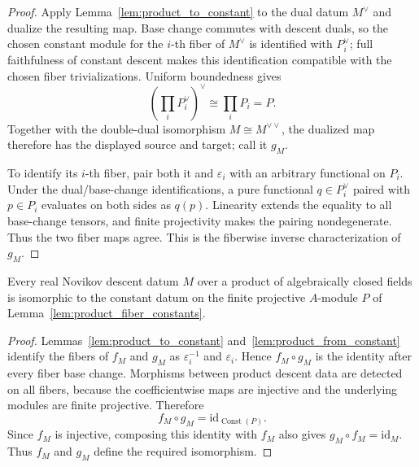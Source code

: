 \begin{proof}
  \leanok
  Apply Lemma~\ref{lem:product_to_constant} to the dual datum $M^\vee$ and
  dualize the resulting map.  Base change commutes with descent duals, so the
  chosen constant module for the $i$-th fiber of $M^\vee$ is identified with
  $P_i^\vee$; full faithfulness of constant descent makes this identification
  compatible with the chosen fiber trivializations.  Uniform boundedness gives
  \[
    \left(\prod_iP_i^\vee\right)^\vee\cong\prod_iP_i=P.
  \]
  Together with the double-dual isomorphism $M\cong M^{\vee\vee}$, the dualized
  map therefore has the displayed source and target; call it $g_M$.

  To identify its $i$-th fiber, pair both it and $\varepsilon_i$ with an
  arbitrary functional on $P_i$.  Under the dual/base-change identifications,
  a pure functional $q\in P_i^\vee$ paired with $p\in P_i$ evaluates on both
  sides as $q(p)$.  Linearity extends the equality to all base-change tensors,
  and finite projectivity makes the pairing nondegenerate.  Thus the two fiber
  maps agree.  This is the fiberwise inverse characterization of $g_M$.
\end{proof}

\begin{theorem}
  \label{thm:product_descent_is_constant}
  \leanok
  Every real Novikov descent datum $M$ over a product of algebraically closed
  fields is isomorphic to the constant datum on the finite projective
  $A$-module $P$ of Lemma~\ref{lem:product_fiber_constants}.
\end{theorem}

\begin{proof}
  \leanok
  Lemmas~\ref{lem:product_to_constant} and~\ref{lem:product_from_constant}
  identify the fibers of $f_M$ and $g_M$ as $\varepsilon_i^{-1}$ and
  $\varepsilon_i$.  Hence $f_M\circ g_M$ is the identity after every fiber base
  change.  Morphisms between product descent data are detected on all fibers,
  because the coefficientwise maps are injective and the underlying modules
  are finite projective.  Therefore
  \[
    f_M\circ g_M=\mathrm{id}_{\operatorname{Const}(P)}.
  \]
  Since $f_M$ is injective, composing this identity with $f_M$ also gives
  $g_M\circ f_M=\mathrm{id}_M$.  Thus $f_M$ and $g_M$ define the required
  isomorphism.
\end{proof}

